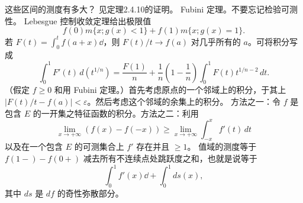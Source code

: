 \begin{enumerate}[label=\textbf{\arabic*.},itemsep=.8em]
这些区间的测度有多大？
 见定理2.4.10的证明。
 Fubini 定理。不要忘记检验可测性。
 Lebesgue 控制收敛定理给出极限值
\[f(0)m\{x;g(x)<1\}+f(1)m\{x;g(x)=1\}.\]
 若 $F(t)=\int_0^t f(a+x)\dd$，则 $F(t)/t\to f(a)$ 对几乎所有的 $a$。可将积分写成
\[\int_0^1 F'(t)\,d(t^{1/n})=\frac{F(1)}n+\frac1n\left(1-\frac1n\right)\int_0^1 F(t)t^{1/n-2}\,dt.\]
（假定 $f\ge0$ 和用 Fubini 定理。）首先考虑原点的一个邻域上的积分，于其上 $|F(t)/t-f(a)|<\varepsilon$。然后考虑这个邻域的余集上的积分。
 方法之一：令 $f$ 是包含 $E$ 的一开集之特征函数的积分。方法之二：利用
\[\lim_{x\to+\infty}(f(x)-f(-x))\ge\lim_{x\to+\infty}\int_{-x}^x f'(t)\,dt\]
以及在一个包含 $E$ 的可测集合上 $f'$ 存在并且 $\ge1$。
 值域的测度等于 $f(1-)-f(0+)$ 减去所有不连续点处跳跃度之和，也就是说等于
\[\int_0^1 f'(x)\dd+\int_0^1 ds(x),\]
其中 $ds$ 是 $df$ 的奇性弥散部分。
\end{enumerate}
